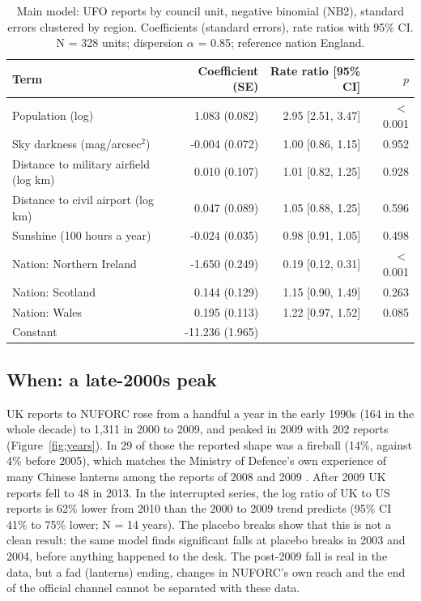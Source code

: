 \documentclass[11pt,a4paper]{article}
\begin{document}
\begin{table}[tbp]\centering\small\caption{Main model: UFO reports by council unit, negative binomial (NB2), standard errors clustered by region. Coefficients (standard errors), rate ratios with 95\% CI. N = 328 units; dispersion $\alpha$ = 0.85; reference nation England.}\label{tab:main}\begin{tabular}{lrrr}\toprule Term & Coefficient (SE) & Rate ratio [95\% CI] & $p$\\\midrule
Population (log) & 1.083 (0.082) & 2.95 [2.51, 3.47] & $<$0.001\\
Sky darkness (mag/arcsec$^2$) & -0.004 (0.072) & 1.00 [0.86, 1.15] & 0.952\\
Distance to military airfield (log km) & 0.010 (0.107) & 1.01 [0.82, 1.25] & 0.928\\
Distance to civil airport (log km) & 0.047 (0.089) & 1.05 [0.88, 1.25] & 0.596\\
Sunshine (100 hours a year) & -0.024 (0.035) & 0.98 [0.91, 1.05] & 0.498\\
Nation: Northern Ireland & -1.650 (0.249) & 0.19 [0.12, 0.31] & $<$0.001\\
Nation: Scotland & 0.144 (0.129) & 1.15 [0.90, 1.49] & 0.263\\
Nation: Wales & 0.195 (0.113) & 1.22 [0.97, 1.52] & 0.085\\
Constant & -11.236 (1.965) & & \\
\bottomrule\end{tabular}\end{table}

\subsection{When: a late-2000s peak}
UK reports to NUFORC rose from a handful a year in the early 1990s (164 in the whole decade) to 1,311 in 2000 to 2009, and peaked in 2009 with 202 reports (Figure~\ref{fig:years}). In 29 of those the reported shape was a fireball (14\%, against 4\% before 2005), which matches the Ministry of Defence's own experience of many Chinese lanterns among the reports of 2008 and 2009 \citep{tna2013}. After 2009 UK reports fell to 48 in 2013. In the interrupted series, the log ratio of UK to US reports is 62\% lower from 2010 than the 2000 to 2009 trend predicts (95\% CI 41\% to 75\% lower; N = 14 years). The placebo breaks show that this is not a clean result: the same model finds significant falls at placebo breaks in 2003 and 2004, before anything happened to the desk. The post-2009 fall is real in the data, but a fad (lanterns) ending, changes in NUFORC's own reach and the end of the official channel cannot be separated with these data.
\end{document}
